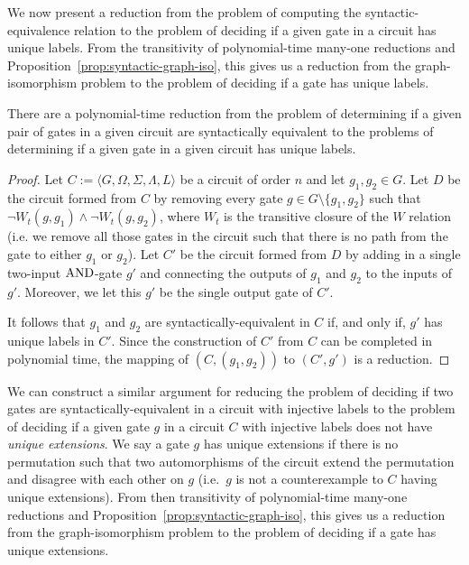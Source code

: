 \documentclass[../paper.tex]{subfiles}
\begin{document}
We now present a reduction from the problem of computing the
syntactic-equivalence relation to the problem of deciding if a given gate in a
circuit has unique labels. From the transitivity of polynomial-time many-one
reductions and Proposition~\ref{prop:syntactic-graph-iso}, this gives us a
reduction from the graph-isomorphism problem to the problem of deciding if a
gate has unique labels.

\begin{lem}
  There are a polynomial-time reduction from the problem of determining if a
  given pair of gates in a given circuit are syntactically equivalent to the
  problems of determining if a given gate in a given circuit has unique labels.
  \label{lem:syntactically-equivalent-unique-labels}
\end{lem}

\begin{proof}
  Let $C := \langle G, \Omega, \Sigma, \Lambda, L \rangle$ be a circuit of order
  $n$ and let $g_1, g_2 \in G$. Let $D$ be the circuit formed from $C$ by
  removing every gate $g \in G \setminus\{g_1, g_2\}$ such that $\neg W_t(g,
  g_1) \land \neg W_t(g, g_2)$, where $W_t$ is the transitive closure of the $W$
  relation (i.e. we remove all those gates in the circuit such that there is no
  path from the gate to either $g_1$ or $g_2$). Let $C'$ be the circuit formed
  from $D$ by adding in a single two-input $\text{\upshape AND}$-gate $g'$ and connecting the
  outputs of $g_1$ and $g_2$ to the inputs of $g'$. Moreover, we let this $g'$
  be the single output gate of $C'$.

  It follows that $g_1$ and $g_2$ are syntactically-equivalent in $C$ if, and
  only if, $g'$ has unique labels in $C'$. Since the construction of $C'$ from
  $C$ can be completed in polynomial time, the mapping of $(C, (g_1, g_2))$ to
  $(C', g')$ is a reduction.
\end{proof}

We can construct a similar argument for reducing the problem of deciding if two
gates are syntactically-equivalent in a circuit with injective labels to the
problem of deciding if a given gate $g$ in a circuit $C$ with injective labels
does not have \emph{unique extensions}. We say a gate $g$ has unique extensions
if there is no permutation such that two automorphisms of the circuit extend the
permutation and disagree with each other on $g$ (i.e.\ $g$ is not a
counterexample to $C$ having unique extensions). From then transitivity of
polynomial-time many-one reductions and
Proposition~\ref{prop:syntactic-graph-iso}, this gives us a reduction from the
graph-isomorphism problem to the problem of deciding if a gate has unique
extensions.
\end{document}

